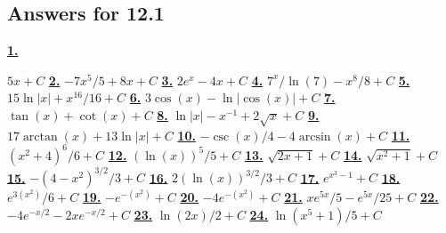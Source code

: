 \subsection *{Answers for 12.1}
\hypertarget {a:12.1.1}{\hyperlink {e:12.1.1}{\bfseries 1.}} \mdseries $5x+C$\qquad 
\hypertarget {a:12.1.2}{\hyperlink {e:12.1.2}{\bfseries 2.}} \mdseries $-7x^5/5 +8x + C$\qquad 
\hypertarget {a:12.1.3}{\hyperlink {e:12.1.3}{\bfseries 3.}} \mdseries $2e^x -4x + C$\qquad 
\hypertarget {a:12.1.4}{\hyperlink {e:12.1.4}{\bfseries 4.}} \mdseries $7^x/\ln (7) - x^8/8 +C$\qquad 
\hypertarget {a:12.1.5}{\hyperlink {e:12.1.5}{\bfseries 5.}} \mdseries $15\ln |x| + x^{16}/16 + C$\qquad 
\hypertarget {a:12.1.6}{\hyperlink {e:12.1.6}{\bfseries 6.}} \mdseries $3\cos (x) -\ln |\cos (x)|+C$\qquad 
\hypertarget {a:12.1.7}{\hyperlink {e:12.1.7}{\bfseries 7.}} \mdseries $\tan (x) + \cot (x) + C$\qquad 
\hypertarget {a:12.1.8}{\hyperlink {e:12.1.8}{\bfseries 8.}} \mdseries $\ln |x| - x^{-1} + 2\sqrt {x} +C$\qquad 
\hypertarget {a:12.1.9}{\hyperlink {e:12.1.9}{\bfseries 9.}} \mdseries $17\arctan (x) + 13\ln |x| +C$\qquad 
\hypertarget {a:12.1.10}{\hyperlink {e:12.1.10}{\bfseries 10.}} \mdseries $-\csc (x)/4 - 4\arcsin (x) + C$\qquad 
\hypertarget {a:12.1.11}{\hyperlink {e:12.1.11}{\bfseries 11.}} \mdseries $(x^2+4)^6/6 + C$\qquad 
\hypertarget {a:12.1.12}{\hyperlink {e:12.1.12}{\bfseries 12.}} \mdseries $(\ln (x))^5/5 +C$\qquad 
\hypertarget {a:12.1.13}{\hyperlink {e:12.1.13}{\bfseries 13.}} \mdseries $\sqrt {2x+1} + C$\qquad 
\hypertarget {a:12.1.14}{\hyperlink {e:12.1.14}{\bfseries 14.}} \mdseries $\sqrt {x^2+1} + C$\qquad 
\hypertarget {a:12.1.15}{\hyperlink {e:12.1.15}{\bfseries 15.}} \mdseries $-(4-x^2)^{3/2}/3 +C$\qquad 
\hypertarget {a:12.1.16}{\hyperlink {e:12.1.16}{\bfseries 16.}} \mdseries $2(\ln (x))^{3/2}/3 +C$\qquad 
\hypertarget {a:12.1.17}{\hyperlink {e:12.1.17}{\bfseries 17.}} \mdseries $e^{x^3-1} + C$\qquad 
\hypertarget {a:12.1.18}{\hyperlink {e:12.1.18}{\bfseries 18.}} \mdseries $e^{3(x^2)}/6+C$\qquad 
\hypertarget {a:12.1.19}{\hyperlink {e:12.1.19}{\bfseries 19.}} \mdseries $-e^{-(x^2)} + C$\qquad 
\hypertarget {a:12.1.20}{\hyperlink {e:12.1.20}{\bfseries 20.}} \mdseries $-4e^{-(x^2)} +C$\qquad 
\hypertarget {a:12.1.21}{\hyperlink {e:12.1.21}{\bfseries 21.}} \mdseries $xe^{5x}/5 - e^{5x}/25 + C$\qquad 
\hypertarget {a:12.1.22}{\hyperlink {e:12.1.22}{\bfseries 22.}} \mdseries $-4e^{-x/2} - 2xe^{-x/2} +C$\qquad 
\hypertarget {a:12.1.23}{\hyperlink {e:12.1.23}{\bfseries 23.}} \mdseries $\ln (2x)/2 + C$\qquad 
\hypertarget {a:12.1.24}{\hyperlink {e:12.1.24}{\bfseries 24.}} \mdseries $\ln (x^5+1)/5 +C$\qquad 
